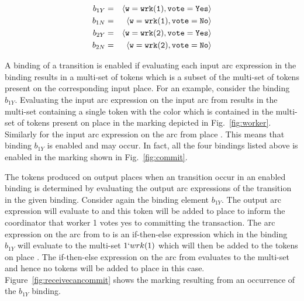 \begin{eqnarray*}
b_{1Y} & = & \langle {\tt{w}} = {\tt{wrk(1)}}, {\tt{vote}} = {\tt{Yes}} \rangle \\
b_{1N} & = & \langle {\tt{w}} = {\tt{wrk(1)}}, {\tt{vote}} = {\tt{No}} \rangle \\
b_{2Y} & = & \langle {\tt{w}} = {\tt{wrk(2)}}, {\tt{vote}} = {\tt{Yes}} \rangle \\
b_{2N} & = & \langle {\tt{w}} = {\tt{wrk(2)}}, {\tt{vote}} = {\tt{No}} \rangle
\end{eqnarray*}

A binding of a transition is enabled if evaluating each input arc
expression in the binding results in a multi-set of tokens which is a
subset of the multi-set of tokens present on the corresponding input
place. For an example, consider the binding $b_{1Y}$. Evaluating the
input arc expression  on the input arc from 
results in the multi-set containing a single token with the color
 which is contained in the multi-set of tokens present
on place  in the marking depicted in
Fig.~\ref{fig:worker}. Similarly for the input arc expression on the
arc from place . This means that binding $b_{1Y}$
is enabled and may occur. In fact, all the four bindings listed above
is enabled in the marking shown in Fig.~\ref{fig:commit}.


The tokens produced on output places when an transition occur in an
enabled binding is determined by evaluating the output arc expressions
of the transition in the given binding. Consider again the binding
element $b_{1Y}$. The output arc expression  will
evaluate to  and this token will be added to place
 to inform the coordinator that worker 1 votes yes to
committing the transaction. The arc expression on the arc from
 to  is an if-then-else
expression which in the binding $b_{1Y}$ will evaluate to the
multi-set $1`wrk(1)$ which will then be added to the tokens on place
. The if-then-else expression on the arc from
 evaluates to the  multi-set
and hence no tokens will be added to place  in this
case. Figure~\ref{fig:receivecancommit} shows the marking resulting
from an occurrence of the $b_{1Y}$ binding.

